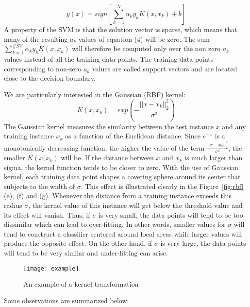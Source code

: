 \documentclass[conference,compsoc]{IEEEtran}
\begin{document}
\begin{equation}
y(x) = sign[\sum_{k=1}^{N}\alpha_ky_kK(x,x_k) +b ]
\end{equation}
A property of the SVM is that the solution vector is sparse, which means that many of the resulting $a_k$ values of equation (4) will be zero. The  sum $\sum_{k=1}^{\#SV}\alpha_ky_kK(x,x_k)$ will therefore be computed only over the non zero $a_k$ values instead of all the training data points. The training data points corresponding to non-zero $a_k$ values are called support vectors and are located close to the decision boundary.

We are particularly interested in the Gaussian (RBF) kernel:
\begin{equation}
K(x,x_k) = exp(-\frac{||x-x_k||^2_2}{\sigma^2})
\end{equation}
The Gaussian kernel measures the similarity between the test instance $x$ and any training instance $x_k$ as a function of the Euclidean distance. Since $e^{-x}$ is a monotonically decreasing function, the higher the value of the term $\frac{||x-x_k||^2_2}{\sigma^2}$, the smaller $K(x,x_k)$ will be. If the distance between $x$ and $x_k$ is much larger than sigma, the kernel function tends to be closer to zero. With the use of Gaussian kernel, each training data point shapes a covering sphere around its center that subjects to the width of $\sigma$. This effect is illustrated clearly in the Figure~\ref{fig:rbf} (e), (f) and (g). Whenever the distance from a training instance exceeds this radius $\sigma$, the kernel value of this instance will get below the threshold value and its effect will vanish. Thus, if $\sigma$ is very small, the data points will tend to be too dissimilar which can lead to over-fitting. In other words, smaller values for $\sigma$ will tend to construct a classifier centered around local areas  while larger values will produce the opposite effect. On the other hand, if $\sigma$ is very large, the data points will tend to be very similar and under-fitting can arise. 

\begin{figure}[]
\centering
            \texttt{[image: example]}
      
        \caption{An example of a kernel transformation }        
                      
        \label{fig:example}
    \end{figure}

Some observations are summarized below:
\end{document}
